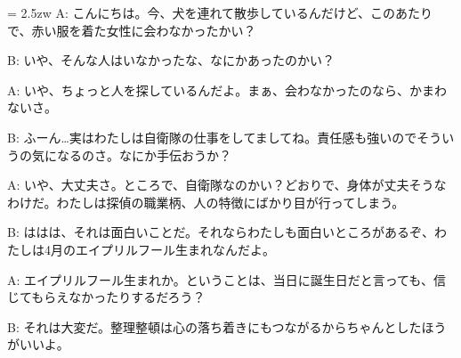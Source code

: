 \documentclass[11pt]{amsart}
\title{}
\author{}
\newenvironment{hangall}[1]{\hangindent = 2.5zw\everypar{\hangindent = 2.5zw}}{}
\begin{document}
\maketitle
\begin{hangall}{}%
A: こんにちは。今、犬を連れて散歩しているんだけど、このあたりで、赤い服を着た女性に会わなかったかい？



B: いや、そんな人はいなかったな、なにかあったのかい？



A: いや、ちょっと人を探しているんだよ。まぁ、会わなかったのなら、かまわないさ。



B: ふーん…実はわたしは自衛隊の仕事をしてましてね。責任感も強いのでそういうの気になるのさ。なにか手伝おうか？



A: いや、大丈夫さ。ところで、自衛隊なのかい？どおりで、身体が丈夫そうなわけだ。わたしは探偵の職業柄、人の特徴にばかり目が行ってしまう。



B: ははは、それは面白いことだ。それならわたしも面白いところがあるぞ、わたしは4月のエイプリルフール生まれなんだよ。



A: エイプリルフール生まれか。ということは、当日に誕生日だと言っても、信じてもらえなかったりするだろう？



B: それは大変だ。整理整頓は心の落ち着きにもつながるからちゃんとしたほうがいいよ。\end{hangall}
\end{document}
